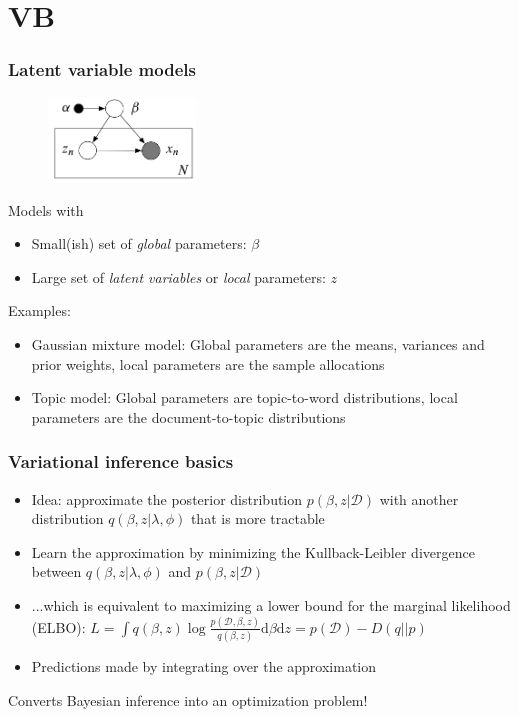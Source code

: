 \documentclass{beamer}
\newcommand{\dataset}{\mathcal{D}}
\newcommand{\diff}{\mathrm{d}}
\begin{document}
\section{VB}

\begin{frame}
  \frametitle{Latent variable models}

  \begin{figure}
  \begin{center}
  \includegraphics[width=0.35\textwidth]{LVM.png}
  \end{center}
  \end{figure}

  Models with
  \begin{itemize}
  \item Small(ish) set of \emph{global} parameters: $\beta$
  \item Large set of \emph{latent variables} or \emph{local} parameters: $z$
  \end{itemize}

  Examples:
  \begin{itemize}
  \item Gaussian mixture model: Global parameters are the means,
    variances and prior weights, local parameters are the sample
    allocations
  \item Topic model: Global parameters are topic-to-word distributions,
    local parameters are the document-to-topic distributions
  \end{itemize}
\end{frame}

\begin{frame}
  \frametitle{Variational inference basics}

  \begin{itemize}
  \item Idea: approximate the posterior distribution $p(\beta, z| \dataset)$
    with another distribution $q(\beta,z|\lambda,\phi)$ that is more
    tractable
  \item Learn the approximation by minimizing the Kullback-Leibler divergence between $q(\beta,z|\lambda,\phi)$ and $p(\beta, z |\dataset)$
  \item ...which is equivalent to maximizing a lower bound for the marginal
    likelihood (ELBO):
    $L = \int q(\beta,z) \log \frac{p(\dataset,\beta,z)}{q(\beta,z)} \diff \beta \diff z = p(\dataset) - D(q||p)$
  \item Predictions made by integrating over the approximation
  \end{itemize}

  Converts Bayesian inference into an optimization problem!
\end{frame}
\end{document}
